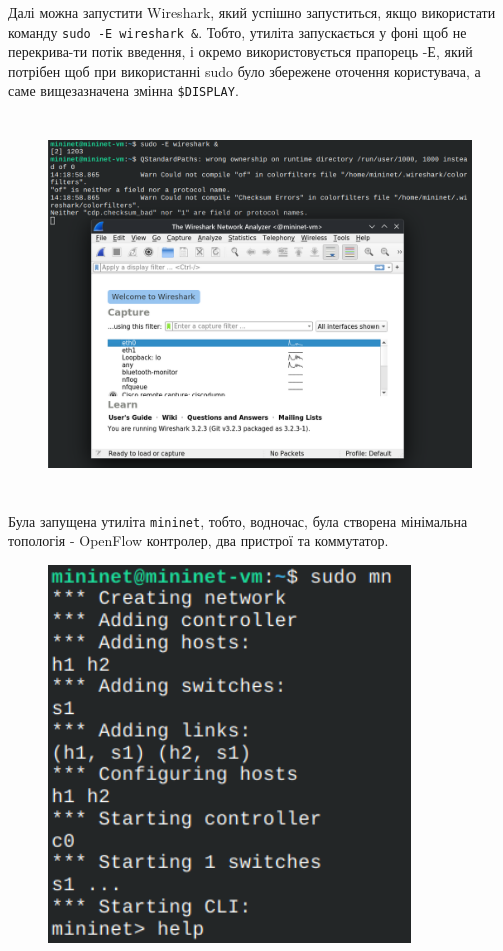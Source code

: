 \documentclass[14pt, a4paper]{extreport}
\begin{document}
	Далі можна запустити Wireshark, який успішно запуститься, якщо використати команду \texttt{sudo -E wireshark \&}. Тобто, утиліта запускається у фоні щоб не перекрива\hyp{}ти потік введення, і окремо використовується прапорець -Е, який потрібен щоб при використанні sudo було збережене оточення користувача, а саме вищезазначена змінна \texttt{\$DISPLAY}.
	
	\begin{figure}[H]
		\centering
		\includegraphics[height=10cm]{06} 
	\end{figure}
	
	Була запущена утиліта \texttt{mininet}, тобто, водночас, була створена мінімальна топологія - OpenFlow контролер, два пристрої та коммутатор.
	
	\begin{figure}[H]
		\centering
		\includegraphics[height=10cm]{07} 
	\end{figure}
	
\end{document}
